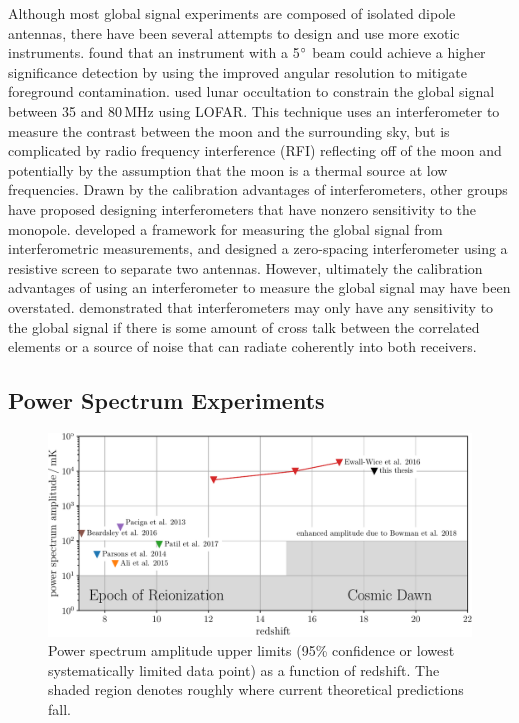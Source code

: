 \begin{bibunit}
Although most global signal experiments are composed of isolated dipole antennas, there have been
several attempts to design and use more exotic instruments. \citet{2013PhRvD..87d3002L} found that
an instrument with a 5$\mbox{$^\circ$}$ beam could achieve a higher significance detection by using the
improved angular resolution to mitigate foreground contamination. \citet{2015MNRAS.450.2291V} used
lunar occultation to constrain the global signal between 35 and 80\,MHz using LOFAR. This technique
uses an interferometer to measure the contrast between the moon and the surrounding sky, but is
complicated by radio frequency interference (RFI) reflecting off of the moon and potentially by the
assumption that the moon is a thermal source at low frequencies. Drawn by the calibration advantages
of interferometers, other groups have proposed designing interferometers that have nonzero
sensitivity to the monopole. \citet{2015ApJ...809...18P} developed a framework for measuring the
global signal from interferometric measurements, and \citet{2015ApJ...815...88S} designed a
zero-spacing interferometer using a resistive screen to separate two antennas. However, ultimately
the calibration advantages of using an interferometer to measure the global signal may have been
overstated.  \citet{2016ApJ...826..116V} demonstrated that interferometers may only have any
sensitivity to the global signal if there is some amount of cross talk between the correlated
elements or a source of noise that can radiate coherently into both receivers.

\subsection{Power Spectrum Experiments}

\begin{figure}[t]
    \centering
    \includegraphics[width=\textwidth]{figures/chapter1/power-spectrum-upper-limits/power-spectrum-upper-limits}
    \caption{
        Power spectrum amplitude upper limits (95\% confidence or lowest systematically limited data
        point) as a function of redshift. The shaded region denotes roughly where current
        theoretical predictions fall.
    }
    \label{fig:power-spectrum-upper-limits}
\end{figure}


\end{bibunit}
